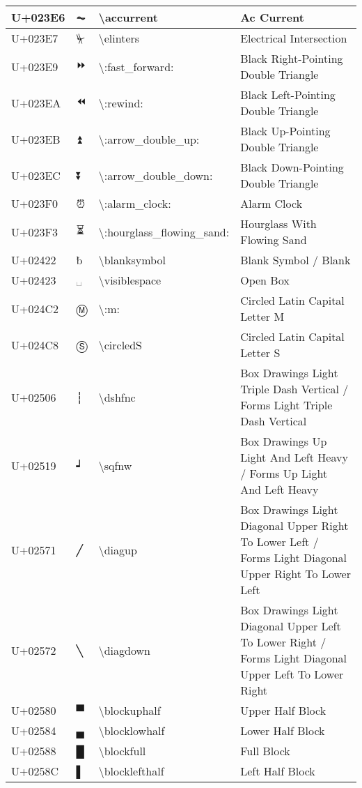 \begin{table}[h]
\begin{tabulary}{\linewidth}{|L|L|L|L|}
\hline
U+023E6 & ⏦ & {\textbackslash}accurrent & Ac Current \\
\hline
U+023E7 & ⏧ & {\textbackslash}elinters & Electrical Intersection \\
\hline
U+023E9 & ⏩ & {\textbackslash}:fast\_forward: & Black Right-Pointing Double Triangle \\
\hline
U+023EA & ⏪ & {\textbackslash}:rewind: & Black Left-Pointing Double Triangle \\
\hline
U+023EB & ⏫ & {\textbackslash}:arrow\_double\_up: & Black Up-Pointing Double Triangle \\
\hline
U+023EC & ⏬ & {\textbackslash}:arrow\_double\_down: & Black Down-Pointing Double Triangle \\
\hline
U+023F0 & ⏰ & {\textbackslash}:alarm\_clock: & Alarm Clock \\
\hline
U+023F3 & ⏳ & {\textbackslash}:hourglass\_flowing\_sand: & Hourglass With Flowing Sand \\
\hline
U+02422 & ␢ & {\textbackslash}blanksymbol & Blank Symbol / Blank \\
\hline
U+02423 & ␣ & {\textbackslash}visiblespace & Open Box \\
\hline
U+024C2 & Ⓜ & {\textbackslash}:m: & Circled Latin Capital Letter M \\
\hline
U+024C8 & Ⓢ & {\textbackslash}circledS & Circled Latin Capital Letter S \\
\hline
U+02506 & ┆ & {\textbackslash}dshfnc & Box Drawings Light Triple Dash Vertical / Forms Light Triple Dash Vertical \\
\hline
U+02519 & ┙ & {\textbackslash}sqfnw & Box Drawings Up Light And Left Heavy / Forms Up Light And Left Heavy \\
\hline
U+02571 & ╱ & {\textbackslash}diagup & Box Drawings Light Diagonal Upper Right To Lower Left / Forms Light Diagonal Upper Right To Lower Left \\
\hline
U+02572 & ╲ & {\textbackslash}diagdown & Box Drawings Light Diagonal Upper Left To Lower Right / Forms Light Diagonal Upper Left To Lower Right \\
\hline
U+02580 & ▀ & {\textbackslash}blockuphalf & Upper Half Block \\
\hline
U+02584 & ▄ & {\textbackslash}blocklowhalf & Lower Half Block \\
\hline
U+02588 & █ & {\textbackslash}blockfull & Full Block \\
\hline
U+0258C & ▌ & {\textbackslash}blocklefthalf & Left Half Block \\

\end{tabulary}
\end{table}
